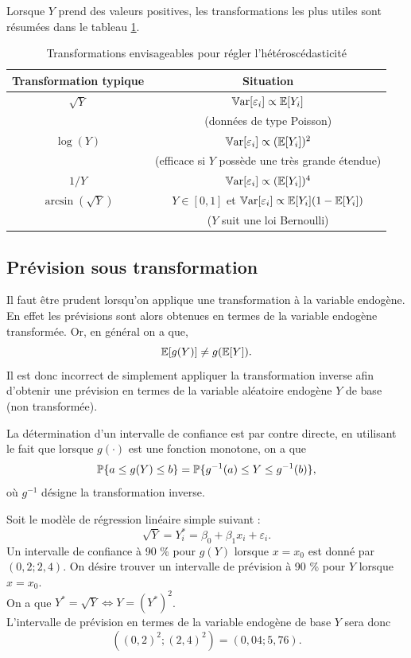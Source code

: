 Lorsque $Y$ prend des valeurs positives, les transformations les plus utiles sont résumées dans le tableau \ref{tab:TransformationHeteroscedasticite}.

{\small
\begin{table}[htbp]
 \centering
 \caption{Transformations envisageables pour régler l'hétéroscédasticité}
  \renewcommand{\arraystretch}{1.6}
  \begin{tabular}{cc}
   \hline
   Transformation typique & Situation \\
   \hline
   $\sqrt{Y}$  & $\var[\varepsilon_i] \propto \esp[Y_i]$ \\
    & (données de type Poisson) \\ \hline
   $\log (Y)$ & $\var[\varepsilon_i] \propto (\esp[Y_i])^2$  \\
   &  (efficace si $Y$ possède une très grande étendue)\\ \hline
   $1/Y$  & $\var[\varepsilon_i] \propto (\esp[Y_i])^4$\\ \hline
   $\arcsin(\sqrt{Y})$ & $Y\in [0,1]$ et $\var[\varepsilon_i] \propto \esp[Y_i] (1-\esp[Y_i])$\\
   & ($Y$ suit une loi Bernoulli)\\
  \end{tabular}
 \label{tab:TransformationHeteroscedasticite}
\end{table}
}



\subsection{Prévision sous transformation}
\label{subsection:previsiontrans}

Il faut être prudent lorsqu'on applique une transformation à la variable endogène. En effet les prévisions sont alors obtenues en termes de la variable endogène transformée. Or, en général on a que,
$$ \esp[g(Y)]\neq g(\esp[Y]).$$ Il est donc incorrect de simplement appliquer la transformation inverse afin d'obtenir une prévision en termes de la variable aléatoire endogène $Y$ de base (non transformée).

La détermination d'un intervalle de confiance est par contre directe, en utilisant le fait que lorsque $g(\cdot)$ est une fonction monotone, on a que
$$\P\{a\leq g(Y)\leq b\}=\P\{g^{-1}(a)\leq Y\leq g^{-1}(b)\},$$ où $g^{-1}$ désigne la transformation inverse.


\begin{exemple}
Soit le modèle de régression linéaire simple suivant :
$$\sqrt{Y}=Y_i^*=\beta_0+\beta_1 x_i+\varepsilon_i.$$ Un intervalle de confiance à 90 \% pour $g(Y)$ lorsque $x=x_0$ est donné par $(0,2;2,4)$. On désire trouver un intervalle de prévision à 90 \% pour $Y$ lorsque $x=x_0$. \\
On a que $Y^*=\sqrt{Y}\Leftrightarrow Y=(Y^{*})^2$.\\
L'intervalle de prévision en termes de la variable endogène de base $Y$ sera donc
$$((0,2)^2;(2,4)^2)=(0,04;5,76).$$
\end{exemple}


